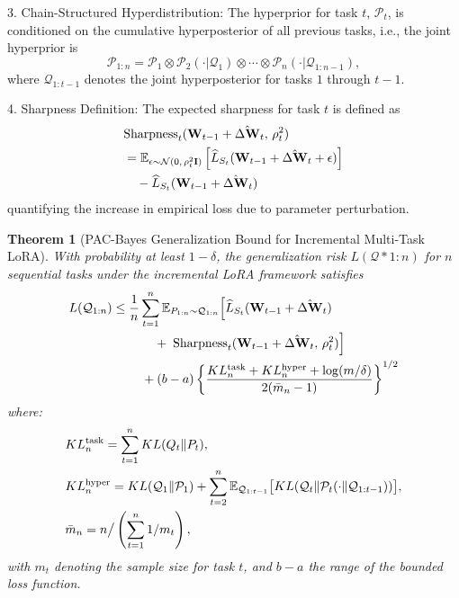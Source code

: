 \documentclass[letterpaper]{article} %
\newtheorem{theorem}{Theorem}
\begin{document}
3. Chain-Structured Hyperdistribution: The hyperprior for task $t$, $\mathcal{P}_t$, is conditioned on the cumulative hyperposterior of all previous tasks, i.e., the joint hyperprior is
   $$
   \mathcal{P}_{1:n} = \mathcal{P}_1 \otimes \mathcal{P}_2(\cdot|\mathcal{Q}_1) \otimes \cdots \otimes \mathcal{P}_n(\cdot|\mathcal{Q}_{1:n-1}),
   $$ where $\mathcal{Q}_{1:t-1}$ denotes the joint hyperposterior for tasks $1$ through $t-1$.

4. Sharpness Definition: The expected sharpness for task $t$ is defined as
\begin{align}
&\mathrm{Sharpness}_t(\mathbf{W}_{t-1} + \hat{\Delta\mathbf{W}}_t,\, \rho_t^2) \notag\\
& = \mathbb{E}_{\epsilon \sim \mathcal{N}(0,\, \rho_t^2 \mathbf{I})}
\left[ \widehat{L}_{S_t}(\mathbf{W}_{t-1} + \hat{\Delta\mathbf{W}}_t + \epsilon) \right] \notag\\
&\quad - \widehat{L}_{S_t}(\mathbf{W}_{t-1} + \hat{\Delta\mathbf{W}}_t) \notag
\end{align}
quantifying the increase in empirical loss due to parameter perturbation.

\begin{theorem}[PAC-Bayes Generalization Bound for Incremental Multi-Task LoRA]
With probability at least $1-\delta$, the generalization risk $L(\mathcal{Q}*{1:n})$ for $n$ sequential tasks under the incremental LoRA framework satisfies
\begin{align}
L(\mathcal{Q}_{1:n}) \leq\; & \frac{1}{n} \sum_{t=1}^n 
    \mathbb{E}_{P_{1:n} \sim \mathcal{Q}_{1:n}}
    \Big[
        \widehat{L}_{S_t}(\mathbf{W}_{t-1} + \hat{\Delta\mathbf{W}}_t)
    \notag \\
&\qquad +\; \mathrm{Sharpness}_t(\mathbf{W}_{t-1} + \hat{\Delta\mathbf{W}}_t,\, \rho_t^2)
    \Big] 
    \notag \\
&\quad + (b-a) \left\{ 
    \frac{KL_n^{\text{task}} + KL_n^{\text{hyper}} + \log(m/\delta)}
         {2(\bar{m}_n - 1)}
\right\}^{1/2}
\label{eq:lora-pac-bayes-bound}
\end{align}
where:
\begin{align}
&KL_n^{\mathrm{task}} = \sum_{t=1}^n KL(Q_t\|P_t), \notag  \\
&KL_n^{\mathrm{hyper}} = KL(\mathcal{Q}_1 \| \mathcal{P}_1) + \sum_{t=2}^n \mathbb{E}_{\mathcal{Q}_{1:t-1}}\big[KL(\mathcal{Q}_t \| \mathcal{P}_t(\cdot \| \mathcal{Q}_{1:t-1}))\big], \notag\\
&\bar{m}_n = n \big/ \left(\sum_{t=1}^n 1/m_t\right), \notag
\end{align}
with $m_t$ denoting the sample size for task $t$, and $b-a$ the range of the bounded loss function.
\end{theorem}
\end{document}
